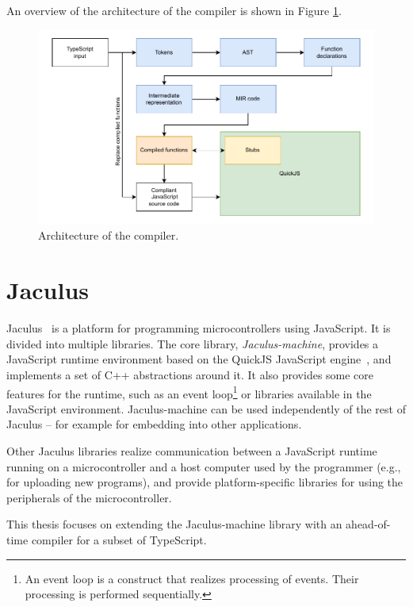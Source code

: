 An overview of the architecture of the compiler is shown in Figure \ref{fig:architecture}.

\begin{figure}
    \centering
    \includegraphics[width=\textwidth, draft=false]{assets/img/architecture.pdf}
    \caption{Architecture of the compiler.}
    \label{fig:architecture}
\end{figure}


\section{Jaculus}\label{jaculus}

Jaculus~\cite{jaculusthesis} is a platform for programming microcontrollers using JavaScript. It is divided into multiple libraries. The core library, \textit{Jaculus-machine}, provides a JavaScript runtime environment based on the QuickJS JavaScript engine~\cite{quickjs}, and implements a set of C++ abstractions around it. It also provides some core features for the runtime, such as an event loop\footnote{An event loop is a construct that realizes processing of events. Their processing is performed sequentially.} or libraries available in the JavaScript environment. Jaculus-machine can be used independently of the rest of Jaculus -- for example for embedding into other applications.

Other Jaculus libraries realize communication between a JavaScript runtime running on a microcontroller and a host computer used by the programmer (e.g., for uploading new programs), and provide platform-specific libraries for using the peripherals of the microcontroller.

This thesis focuses on extending the Jaculus-machine library with an ahead-of-time compiler for a subset of TypeScript.


